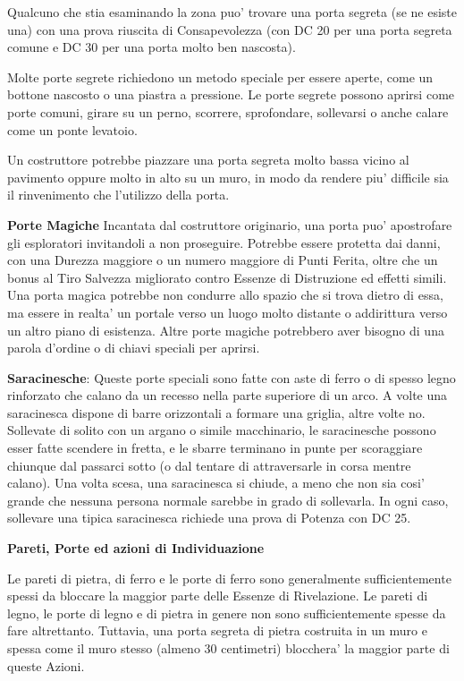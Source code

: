 \documentclass[a4paper,11pt,twoside,openany]{dndbook}
\begin{document}
Qualcuno che stia esaminando la zona puo' trovare una porta segreta (se ne esiste una) con una prova riuscita di Consapevolezza (con DC 20 per una porta segreta comune e DC 30 per una porta molto ben nascosta).

Molte porte segrete richiedono un metodo speciale per essere aperte, come un bottone nascosto o una piastra a pressione. Le porte segrete possono aprirsi come porte comuni, girare su un perno, scorrere, sprofondare, sollevarsi o anche calare come un ponte levatoio.

Un costruttore potrebbe piazzare una porta segreta molto bassa vicino al pavimento oppure molto in alto su un muro, in modo da rendere piu' difficile sia il rinvenimento che l'utilizzo della porta.

\textbf{Porte Magiche} Incantata dal costruttore originario, una porta puo' apostrofare gli esploratori invitandoli a non proseguire. Potrebbe essere protetta dai danni, con una Durezza maggiore o un numero maggiore di Punti Ferita, oltre che un bonus al Tiro Salvezza migliorato contro Essenze di Distruzione ed effetti simili. Una porta magica potrebbe non condurre allo spazio che si trova dietro di essa, ma essere in realta' un portale verso un luogo molto distante o addirittura verso un altro piano di esistenza. Altre porte magiche potrebbero aver bisogno di una parola d'ordine o di chiavi speciali per aprirsi.

\textbf{Saracinesche}: Queste porte speciali sono fatte con aste di ferro o di spesso legno rinforzato che calano da un recesso nella parte superiore di un arco. A volte una saracinesca dispone di barre orizzontali a formare una griglia, altre volte no. Sollevate di solito con un argano o simile macchinario, le saracinesche possono esser fatte scendere in fretta, e le sbarre terminano in punte per scoraggiare chiunque dal passarci sotto (o dal tentare di attraversarle in corsa mentre calano). Una volta scesa, una saracinesca si chiude, a meno che non sia cosi' grande che nessuna persona normale sarebbe in grado di sollevarla. In ogni caso, sollevare una tipica saracinesca richiede una prova di Potenza con DC 25.

\textbf{Pareti, Porte ed azioni di Individuazione}

Le pareti di pietra, di ferro e le porte di ferro sono generalmente sufficientemente spessi da bloccare la maggior parte delle Essenze di Rivelazione. Le pareti di legno, le porte di legno e di pietra in genere non sono sufficientemente spesse da fare altrettanto. Tuttavia, una porta segreta di pietra costruita in un muro e spessa come il muro stesso (almeno 30 centimetri) blocchera' la maggior parte di queste Azioni.
\end{document}
